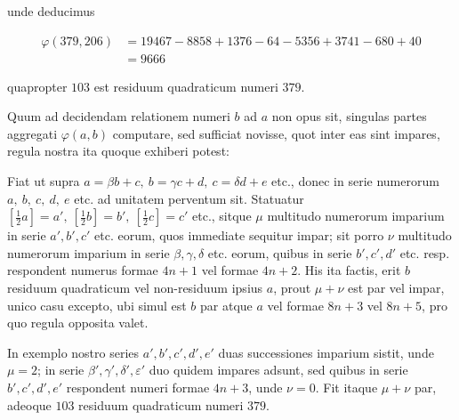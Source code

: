unde deducimus

%
\[
\begin{aligned}
\varphi(379,206)&=19467-8858+1376-64-5356+3741-680+40\\
&=9666
\end{aligned}
\]

quapropter $103$ est residuum quadraticum numeri $379$.


Quum ad decidendam relationem numeri $b$ ad $a$ non opus sit, singulas partes aggregati $\varphi(a,b)$ computare, sed sufficiat novisse, quot inter eas sint impares, regula nostra ita quoque exhiberi potest:

Fiat ut supra $a=\beta b+c,\ b=\gamma c+d,\ c=\delta d+e$ etc., donec in serie numerorum $a,\ b,\ c,\ d,\ e$ etc. ad unitatem perventum sit. Statuatur $[\frac12a]=a',\ [\frac12b]=b',\ [\frac12c]=c'$ etc., sitque $\mu$ multitudo numerorum imparium in serie $a',b',c'$ etc. eorum, quos immediate sequitur impar; sit porro $\nu$ multitudo numerorum imparium in serie $\beta,\gamma,\delta$ etc. eorum, quibus in serie $b',c',d'$ etc. resp. respondent numerus formae $4n+1$ vel formae $4n+2$. His ita factis, erit $b$ residuum quadraticum vel non-residuum ipsius $a$, prout $\mu+\nu$ est par vel impar, unico casu excepto, ubi simul est $b$ par atque $a$ vel formae $8n+3$ vel $8n+5$, pro quo regula opposita valet.

In exemplo nostro series $a',b',c',d',e'$ duas successiones imparium sistit, unde $\mu=2$; in serie $\beta',\gamma',\delta',\varepsilon'$ duo quidem impares adsunt, sed quibus in serie $b',c',d',e'$ respondent numeri formae $4n+3$, unde $\nu=0$. Fit itaque $\mu+\nu$ par, adeoque $103$ residuum quadraticum numeri $379$.

\BookRule{42mm}

